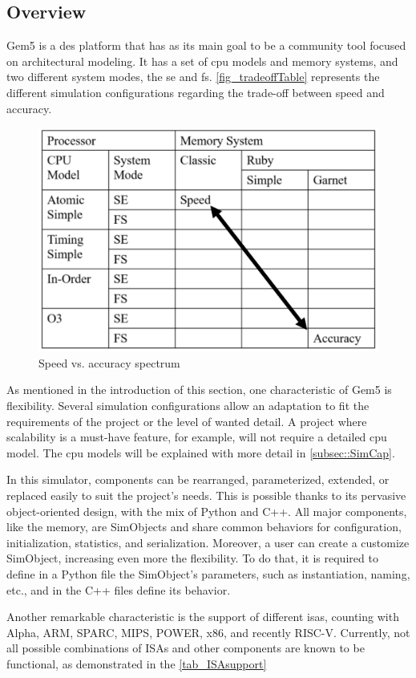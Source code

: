 \subsection{Overview}

Gem5 is a \gls{des} platform that has as its main goal to be a community tool focused on architectural modeling. It has a set of \gls{cpu} models and memory systems, and two different system modes, the \gls{se} and \gls{fs}. \autoref{fig_tradeoffTable} represents the different simulation configurations regarding the trade-off between speed and accuracy. 

\begin{figure}[H]
	\centering
 	\includegraphics[width=0.6\linewidth]{Images/tradeoffTable.png}
 	\caption{Speed vs. accuracy spectrum \cite{TheGem5Simulator}}
	 \label{fig_tradeoffTable}
\end{figure}

As mentioned in the introduction of this section, one characteristic of Gem5 is flexibility. Several simulation configurations allow an adaptation to fit the requirements of the project or the level of wanted detail. A project where scalability is a must-have feature, for example, will not require a detailed \gls{cpu} model. The \gls{cpu} models will be explained with more detail in \autoref{subsec::SimCap}. 

In this simulator, components can be rearranged, parameterized, extended, or replaced easily to suit the project's needs. This is possible thanks to its pervasive object-oriented design, with the mix of Python and C++. All major components, like the memory, are SimObjects and share common behaviors for configuration, initialization, statistics, and serialization. Moreover, a user can create a customize SimObject, increasing even more the flexibility. To do that, it is required to define in a Python file the SimObject’s parameters, such as instantiation, naming, etc., and in the C++ files define its behavior.

Another remarkable characteristic is the support of different \glspl{isa}, counting with Alpha, ARM, SPARC, MIPS, POWER, x86, and recently RISC-V. Currently, not all possible combinations of ISAs and other components are known to be functional, as demonstrated in the \autoref{tab_ISAsupport}

